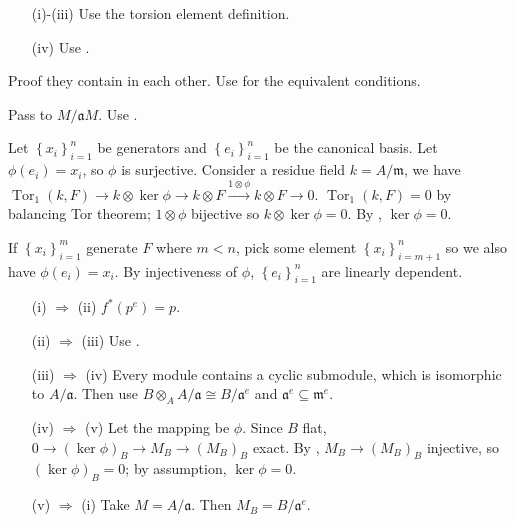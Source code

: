 \begin{exercise}\label{ex3.12}
	\begin{enumerate}
		\item[(i)-(iii)] Use the torsion element definition.
		\item[(iv)] Use .
	\end{enumerate}
\end{exercise}

\begin{exercise}\label{ex3.13}
	Proof they contain in each other. Use  for the equivalent conditions.
\end{exercise}

\begin{exercise}\label{ex3.14}
	Pass to $M/\mathfrak{a}M$. Use .
\end{exercise}

\begin{exercise}\label{ex3.15}
	Let $\left\{x_i\right\}_{i=1}^n$ be generators and $\left\{e_i\right\}_{i=1}^n$ be the canonical basis. Let $\phi(e_i)=x_i$, so $\phi$ is surjective. Consider a residue field $k=A/\mathfrak{m}$, we have $\operatorname{Tor}_1(k,F)\rightarrow k\otimes\ker\phi\rightarrow k\otimes F\xrightarrow{1\otimes\phi}k\otimes F\rightarrow0$. $\operatorname{Tor}_1(k,F)=0$ by balancing Tor theorem; $1\otimes\phi$ bijective so $k\otimes\ker\phi=0$. By , $\ker\phi=0$.
	
	If $\left\{x_i\right\}_{i=1}^m$ generate $F$ where $m<n$, pick some element $\left\{x_i\right\}_{i=m+1}^n$ so we also have $\phi(e_i)=x_i$. By injectiveness of $\phi$, $\left\{e_i\right\}_{i=1}^n$ are linearly dependent.
\end{exercise}

\begin{exercise}\label{ex3.16}
	\begin{enumerate}
		\item[(i) $\Rightarrow$ (ii)]$f^*\left(p^e\right)=p$.
		\item[(ii) $\Rightarrow$ (iii)] Use .
		\item[(iii) $\Rightarrow$ (iv)] Every module contains a cyclic submodule, which is isomorphic to $A/\mathfrak{a}$. Then use $B\otimes_AA/\mathfrak{a}\cong B/\mathfrak{a}^e$ and $\mathfrak{a}^e\subseteq\mathfrak{m}^e$.
		\item[(iv) $\Rightarrow$ (v)] Let the mapping be $\phi$. Since $B$ flat, $0\rightarrow(\ker\phi)_B\rightarrow M_B\rightarrow\left(M_B\right)_B$ exact. By , $M_B\rightarrow\left(M_B\right)_B$ injective, so $(\ker\phi)_B=0$; by assumption, $\ker\phi=0$.
		\item[(v) $\Rightarrow$ (i)] Take $M=A/\mathfrak{a}$. Then $M_B=B/\mathfrak{a}^e$.
	\end{enumerate}
\end{exercise}

